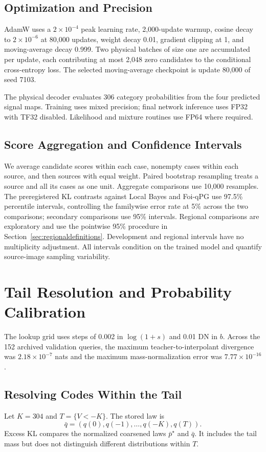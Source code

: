\documentclass[10pt,twocolumn,journal]{IEEEtran}
\begin{document}
\subsection{Optimization and Precision}
AdamW uses a $2\times10^{-4}$ peak learning rate, 2,000-update warmup, cosine decay to $2\times10^{-6}$ at 80,000 updates, weight decay 0.01, gradient clipping at 1, and moving-average decay 0.999. Two physical batches of size one are accumulated per update, each contributing at most 2,048 zero candidates to the conditional cross-entropy loss. The selected moving-average checkpoint is update 80,000 of seed 7103.

The physical decoder evaluates 306 category probabilities from the four predicted signal maps. Training uses mixed precision; final network inference uses FP32 with TF32 disabled. Likelihood and mixture routines use FP64 where required.

\subsection{Score Aggregation and Confidence Intervals}\label{sec:scoreaggregation}
We average candidate scores within each case, nonempty cases within each source, and then sources with equal weight. Paired bootstrap resampling treats a source and all its cases as one unit. Aggregate comparisons use 10,000 resamples. The preregistered KL contrasts against Local Bayes and Foi-qPG use 97.5\% percentile intervals, controlling the familywise error rate at 5\% across the two comparisons; secondary comparisons use 95\% intervals. Regional comparisons are exploratory and use the pointwise 95\% procedure in Section~\ref{sec:regionaldefinitions}. Development and regional intervals have no multiplicity adjustment. All intervals condition on the trained model and quantify source-image sampling variability.

\section{Tail Resolution and Probability Calibration}
The lookup grid uses steps of 0.002 in $\log(1+s)$ and 0.01 DN in $b$. Across the 152 archived validation queries, the maximum teacher-to-interpolant divergence was $2.18\times10^{-7}$ nats and the maximum mass-normalization error was $7.77\times10^{-16}$.

\subsection{Resolving Codes Within the Tail}
Let $K=304$ and $T=\{V<-K\}$. The stored law is
\begin{equation}
\bar q=(q(0),q(-1),\ldots,q(-K),q(T)).
\end{equation}
Excess KL compares the normalized coarsened laws $\bar p^\star$ and $\bar q$. It includes the tail mass but does not distinguish different distributions within $T$.
\end{document}
